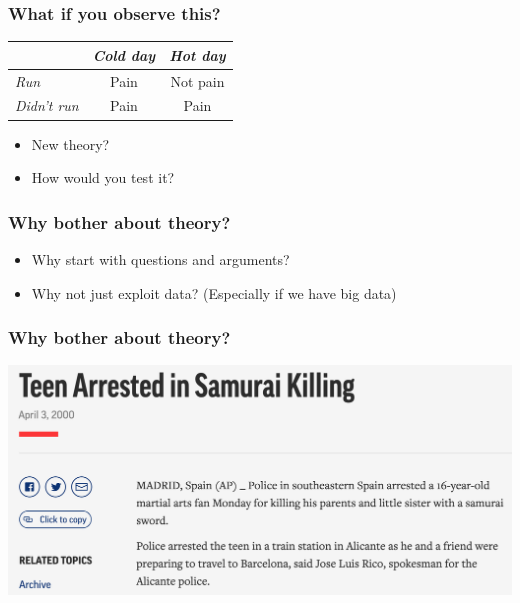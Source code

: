 \documentclass[aspectratio=43]{beamer}
\begin{document}
\begin{frame}
\frametitle{What if you observe this?}
\centering

\begin{tabular}{|l|c|c|}
\toprule
            & \textit{Cold day} & \textit{Hot day} \\
\midrule
\textit{Run}         & Pain & Not pain \\
\midrule
\textit{Didn't run}  & Pain & Pain \\
\bottomrule
\end{tabular}

\vspace{20pt}

\begin{itemize}
  \item New theory?
  \item How would you test it?
\end{itemize}

\end{frame}

\begin{frame}
\frametitle{Why bother about theory?}
\centering

\begin{itemize}
  \item Why start with questions and arguments?
  \item[] Why not just exploit data? (Especially if we have big data)
\end{itemize}

\end{frame}

\begin{frame}
\frametitle{Why bother about theory?}
\centering

\includegraphics[width = \textwidth]{../img/katana}

\end{frame}
\end{document}
